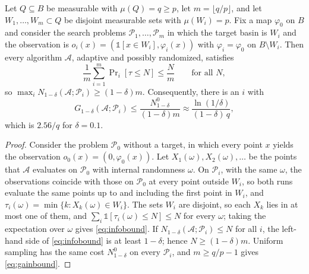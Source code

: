 \begin{theorem}\label{thm:info}
Let $Q\subseteq B$ be measurable with $\mu(Q)=q\ge p$, let $m=\lfloor q/p\rfloor$, and let $W_1,\dots,W_m\subset Q$ be disjoint measurable sets with $\mu(W_i)=p$. Fix a map $\varphi_0$ on $B$ and consider the search problems $\mathcal P_1,\dots,\mathcal P_m$ in which the target basin is $W_i$ and the observation is $o_i(x)=(\mathbb 1[x\in W_i],\varphi_i(x))$ with $\varphi_i=\varphi_0$ on $B\setminus W_i$. Then every algorithm $\mathcal A$, adaptive and possibly randomized, satisfies
\begin{equation}
\frac1m\sum_{i=1}^m\Pr\nolimits_i[\tau\le N]\le\frac Nm\qquad\text{for all } N,
\label{eq:infobound}
\end{equation}
so $\max_i N_{1-\delta}(\mathcal A;\mathcal P_i)\ge(1-\delta)m$. Consequently, there is an $i$ with
\begin{equation}
G_{1-\delta}(\mathcal A;\mathcal P_i)\le\frac{N^0_{1-\delta}}{(1-\delta)m}\approx\frac{\ln(1/\delta)}{(1-\delta)\,q},
\label{eq:gainbound}
\end{equation}
which is $2.56/q$ for $\delta=0.1$.
\end{theorem}

\begin{proof}
Consider the problem $\mathcal P_0$ without a target, in which every point $x$ yields the observation $o_0(x)=(0,\varphi_0(x))$. Let $X_1(\omega),X_2(\omega),\dots$ be the points that $\mathcal A$ evaluates on $\mathcal P_0$ with internal randomness $\omega$. On $\mathcal P_i$, with the same $\omega$, the observations coincide with those on $\mathcal P_0$ at every point outside $W_i$, so both runs evaluate the same points up to and including the first point in $W_i$, and $\tau_i(\omega)=\min\{k: X_k(\omega)\in W_i\}$. The sets $W_i$ are disjoint, so each $X_k$ lies in at most one of them, and $\sum_i\mathbb 1[\tau_i(\omega)\le N]\le N$ for every $\omega$; taking the expectation over $\omega$ gives \eqref{eq:infobound}. If $N_{1-\delta}(\mathcal A;\mathcal P_i)\le N$ for all $i$, the left-hand side of \eqref{eq:infobound} is at least $1-\delta$; hence $N\ge(1-\delta)m$. Uniform sampling has the same cost $N^0_{1-\delta}$ on every $\mathcal P_i$, and $m\ge q/p-1$ gives \eqref{eq:gainbound}.
\end{proof}

